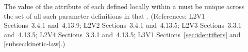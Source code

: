 The value of the  attribute of each \LocalParameter defined locally within
a \KineticLaw must be unique across the set of all such parameter
definitions in that \KineticLaw.  (References: L2V1 Sections~3.4.1 and~4.13.9;
L2V2 Sections~3.4.1 and~4.13.5; L2V3 Sections~3.3.1 and~4.13.5;
L2V4 Sections~3.3.1 and~4.13.5; L3V1 Sections~\ref{sec:identifiers} 
and \ref{subsec:kinetic-law}.)
